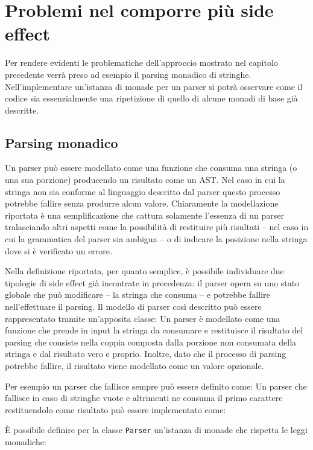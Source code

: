 \section{Problemi nel comporre più side effect}

Per rendere evidenti le problematiche dell'approccio mostrato nel capitolo precedente verrà preso ad esempio il parsing monadico di stringhe.
Nell'implementare un'istanza di monade per un parser si potrà osservare come il codice sia essenzialmente una ripetizione di quello di alcune monadi di base già descritte.

\subsection{Parsing monadico}
\label{sec:parsing-monadico}
Un parser può essere modellato come una funzione che consuma una stringa (o una sua porzione) producendo un risultato come un AST. Nel caso in cui la stringa non sia conforme al linguaggio descritto dal parser questo processo potrebbe fallire senza produrre alcun valore.
Chiaramente la modellazione riportata è una semplificazione che cattura solamente l'essenza di un parser tralasciando altri aspetti come la possibilità di restituire più risultati -- nel caso in cui la grammatica del parser sia ambigua -- o di indicare la posizione nella stringa dove si è verificato un errore.

Nella definizione riportata, per quanto semplice, è possibile individuare due tipologie di side effect già incontrate in precedenza: il parser opera su uno stato globale che può modificare -- la stringa che consuma -- e potrebbe fallire nell'effettuare il parsing.
Il modello di parser così descritto può essere rappresentato tramite un'apposita classe:
Un parser è modellato come una funzione che prende in input la stringa da consumare e restituisce il risultato del parsing che consiste nella coppia composta dalla porzione non consumata della stringa e dal risultato vero e proprio. Inoltre, dato che il processo di parsing potrebbe fallire, il risultato viene modellato come un valore opzionale.

Per esempio un parser che fallisce sempre può essere definito come:
Un parser che fallisce in caso di stringhe vuote e altrimenti ne consuma il primo carattere restituendolo come risultato può essere implementato come:

È possibile definire per la classe \lstinline{Parser} un'istanza di monade che rispetta le leggi monadiche:

